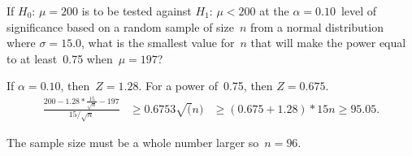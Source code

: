 \begin{problem}
  If $H_0$: ${\mu = 200}$ is to be tested against $H_1$: ${\mu < 200}$ at the ${\alpha = 0.10}$~level of significance based on a random sample of size~$n$ from a normal distribution where ${\sigma = 15.0}$, what is the smallest value for~$n$ that will make the power equal to at least~0.75 when~${\mu = 197}$?
\end{problem}

If ${\alpha = 0.10}$, then~${Z = 1.28}$.  For a power of~0.75, then ${Z=0.675}$.
\begin{align*}
  \frac{200 - 1.28 *\frac{15}{\sqrt{n}} - 197}{15 / \sqrt{n}} &\geq 0.675
  3 \sqrt(n) &\geq ( 0.675 + 1.28) * 15
  n \geq 95.05 \text{.}
\end{align*}

The sample size must be a whole number larger so~$\boxed{n = 96}$.
